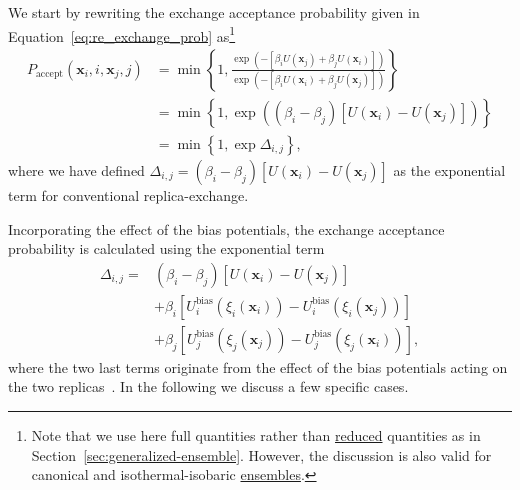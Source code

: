 \documentclass[9pt,review]{livecoms}
\newcommand{\vx}{\mathbf{x}}
\providecommand{\DIFaddtex}[1]{{\protect\color{blue}\uwave{#1}}} %
\providecommand{\DIFaddbegin}{} %
\providecommand{\DIFaddend}{} %
\providecommand{\DIFadd}[1]{\texorpdfstring{\DIFaddtex{#1}}{#1}} %
\newcommand{\DIFaddincludegraphics}[2][]{{\color{blue}\fbox{\DIFOincludegraphics[#1]{#2}}}} %
\DeclareRobustCommand{\DIFaddbegin}{\DIFOaddbegin \let\includegraphics\DIFaddincludegraphics} %
\DeclareRobustCommand{\DIFaddend}{\DIFOaddend \let\includegraphics\DIFOincludegraphics} %
\begin{document}
We start by rewriting the exchange acceptance probability given in Equation~\ref{eq:re_exchange_prob}
as\DIFaddbegin \DIFadd{~}\DIFaddend \footnote{Note that we use here full quantities rather than \hyperlink{ref:reduced} {reduced} quantities as in Section~\ref{sec:generalized-ensemble}. However, the discussion is also valid for canonical and isothermal-isobaric \DIFaddbegin \hyperlink{ref:Ensemble} {\DIFaddend ensembles\DIFaddbegin }\DIFaddend .}
\begin{align}
\label{eq:replexc_acceptance probability}
P_\mathrm{accept}(\vx_i, i, \vx_j, j) &=
\min\left\{1,\frac{\exp(-[\beta_{i}U(\vx_j)+\beta_{j}U(\vx_i)])}{\exp(-[\beta_{i}U(\vx_i)+\beta_{j}U(\vx_j)])}\right\}
\nonumber \\
&=
\min\left\{1,\exp\left(\left(\beta_{i} - \beta_{j}\right)
\left[U(\vx_{i}) - U(\vx_{j})\right]\right)\right\}
\nonumber \\
&=
\min\left\{1,\exp \Delta_{i,j}\right\},
\end{align}
where we have defined $\Delta_{i,j}=\left(\beta_{i} - \beta_{j}\right)
\left[U(\vx_{i}) - U(\vx_{j})\right]
$ as the exponential term for conventional replica-exchange.

Incorporating the effect of the bias potentials, the exchange acceptance probability is calculated using the exponential term
\begin{align}
\Delta_{i,j} = &
\left(\beta_{i} - \beta_{j}\right)
\left[U(\vx_{i}) - U(\vx_{j})\right]
\nonumber \\ & +
\beta_{i} \left[
U^{\mathrm{bias}}_{i}(\xi_{i}(\vx_{i})) - U^{\mathrm{bias}}_{i}(\xi_{i}(\vx_{j}))
\right]
\nonumber \\ & +
\beta_{j} \left[
U^{\mathrm{bias}}_{j}(\xi_{j}(\vx_{j})) - U^{\mathrm{bias}}_{j}(\xi_{j}(\vx_{i}))
\right],
\end{align}
where the two last terms originate from the effect of the bias potentials acting on the two replicas~\cite{Bussi-JACS-2006}. In the following we discuss a few specific cases.
\end{document}

